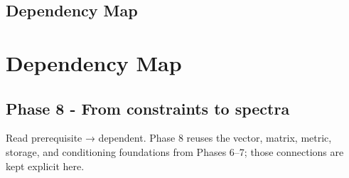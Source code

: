 \hypertarget{appendix-4ad47bdd269a}{}
\section*{Dependency Map}
\chapter{Dependency Map}\label{appendix-4ad47bdd269a-dependency-map}

\section{Phase 8 - From constraints to spectra}\label{appendix-4ad47bdd269a-phase-8---from-constraints-to-spectra}

Read prerequisite → dependent. Phase 8 reuses the vector, matrix, metric, storage, and conditioning foundations from Phases 6--7; those connections are kept explicit here.

